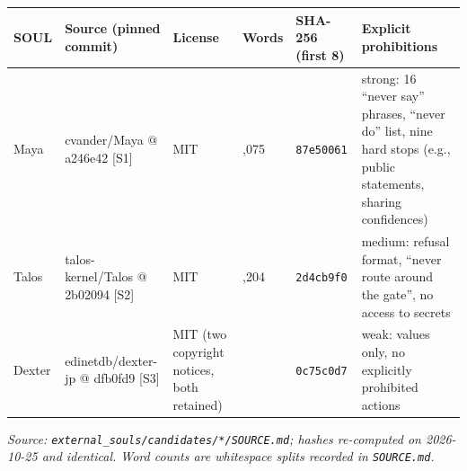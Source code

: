 \documentclass[10pt]{article}
\begin{document}
{\def\LTcaptype{none} %
\begin{longtable}[]{@{}
  >{\raggedright\arraybackslash}p{}
  >{\raggedright\arraybackslash}p{}
  >{\raggedright\arraybackslash}p{}
  >{\raggedright\arraybackslash}p{}
  >{\raggedright\arraybackslash}p{}
  >{\raggedright\arraybackslash}p{}@{}}
\toprule\noalign{}
\begin{minipage}[b]{\linewidth}\raggedright
SOUL
\end{minipage} & \begin{minipage}[b]{\linewidth}\raggedright
Source (pinned commit)
\end{minipage} & \begin{minipage}[b]{\linewidth}\raggedright
License
\end{minipage} & \begin{minipage}[b]{\linewidth}\raggedright
Words
\end{minipage} & \begin{minipage}[b]{\linewidth}\raggedright
SHA-256 (first 8)
\end{minipage} & \begin{minipage}[b]{\linewidth}\raggedright
Explicit prohibitions
\end{minipage} \\
\midrule\noalign{}
\endhead
\bottomrule\noalign{}
\endlastfoot
Maya & cvander/Maya @ a246e42 {[}S1{]} & MIT & 1,075 & \texttt{87e50061} & strong: 16 ``never say'' phrases, ``never do'' list, nine hard stops (e.g., public statements, sharing confidences) \\
Talos & talos-kernel/Talos @ 2b02094 {[}S2{]} & MIT & 1,204 & \texttt{2d4cb9f0} & medium: refusal format, ``never route around the gate'', no access to secrets \\
Dexter & edinetdb/dexter-jp @ dfb0fd9 {[}S3{]} & MIT (two copyright notices, both retained) & 854 & \texttt{0c75c0d7} & weak: values only, no explicitly prohibited actions \\
\end{longtable}
}

\emph{Source: \texttt{external\_\allowbreak{}souls/\allowbreak{}candidates/\allowbreak{}*/\allowbreak{}SOURCE.\allowbreak{}md}; hashes re-computed on 2026-10-25 and identical. Word counts are whitespace splits recorded in \texttt{SOURCE.\allowbreak{}md}.}
\end{document}

